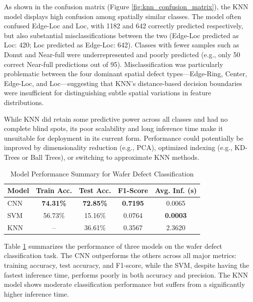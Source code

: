 \documentclass[conference]{IEEEtran}
\begin{document}
As shown in the confusion matrix (Figure \ref{fig:knn_confusion_matrix}), the KNN model displays high confusion among spatially similar classes.
The model often confused Edge-Loc and Loc, with 1182 and 642 correctly predicted respectively, but also substantial misclassifications between the two (Edge-Loc predicted as Loc: 420; Loc predicted as Edge-Loc: 642).
Classes with fewer samples such as Donut and Near-full were underrepresented and poorly predicted (e.g., only 50 correct Near-full predictions out of 95).
Misclassification was particularly problematic between the four dominant spatial defect types—Edge-Ring, Center, Edge-Loc, and Loc—suggesting that KNN's distance-based decision boundaries were insufficient for distinguishing subtle spatial variations in feature distributions.

While KNN did retain some predictive power across all classes and had no complete blind spots, its poor scalability and long inference time make it unsuitable for deployment in its current form. 
Performance could potentially be improved by dimensionality reduction (e.g., PCA), optimized indexing (e.g., KD-Trees or Ball Trees), or switching to approximate KNN methods.

\begin{table}[h!]
    \centering
    \caption{Model Performance Summary for Wafer Defect Classification}
    \begin{tabular}{lcccc}
    \toprule
    \textbf{Model} & \textbf{Train Acc.} & \textbf{Test Acc.} & \textbf{F1-Score} & \textbf{Avg. Inf. (s)} \\
    \midrule
    CNN  & \textbf{74.31\%} & \textbf{72.85\%} & \textbf{0.7195} & 0.0065 \\
    SVM  & 56.73\% & 15.16\% & 0.0764 & \textbf{0.0003} \\
    KNN  & --       & 36.61\% & 0.3567 & 2.3620 \\
    \bottomrule
    \end{tabular}
    \label{tab:model_performance}
\end{table}

Table \ref{tab:model_performance} summarizes the performance of three models on the wafer defect classification task. 
The CNN outperforms the others across all major metrics: training accuracy, test accuracy, and F1-score, while the SVM, despite having the fastest inference time, performs poorly in both accuracy and precision. 
The KNN model shows moderate classification performance but suffers from a significantly higher inference time.
\end{document}
